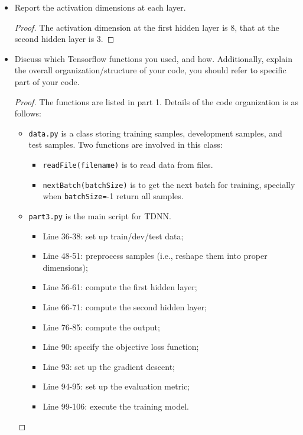 \documentclass[11pt]{article}
\newcommand{\1}{\mathbf{1}}
\begin{document}
{\begin{itemize}
\begin{proof}
  \end{proof}
  \item Report the activation dimensions at each layer.
  \begin{proof}
    The activation dimension at the first hidden layer is 8, that at the second hidden layer is 3.
  \end{proof}
  \item Discuss which Tensorflow functions you used, and how. Additionally, explain the overall organization/structure of your code, you should refer to specific part of your code.
  \begin{proof}
    The functions are listed in part 1. Details of the code organization is as follows:
    \begin{itemize}
      \item {\tt data.py} is a class storing training samples, development samples, and test samples. Two functions are involved in this class:
          \begin{itemize}
            \item {\tt readFile(filename)} is to read data from files.
            \item {\tt nextBatch(batchSize)} is to get the next batch for training, specially when {\tt batchSize=}-1 return all samples.
          \end{itemize}
      \item {\tt part3.py} is the main script for TDNN.
      \begin{itemize}
        \item Line 36-38: set up train/dev/test data;
        \item Line 48-51: preprocess samples (i.e., reshape them into proper dimensions);
        \item Line 56-61: compute the first hidden layer;
        \item Line 66-71: compute the second hidden layer;
        \item Line 76-85: compute the output;
        \item Line 90: specify the objective loss function;
        \item Line 93: set up the gradient descent;
        \item Line 94-95: set up the evaluation metric;
        \item Line 99-106: execute the training model.
      \end{itemize}
    \end{itemize}
  \end{proof}
\end{itemize}

}
\end{document}

